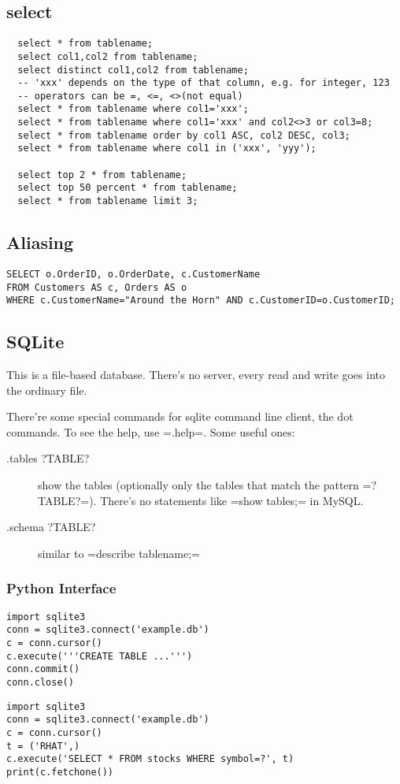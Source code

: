 \subsection{select}
\begin{lstlisting}
  select * from tablename;
  select col1,col2 from tablename;
  select distinct col1,col2 from tablename;
  -- 'xxx' depends on the type of that column, e.g. for integer, 123
  -- operators can be =, <=, <>(not equal)
  select * from tablename where col1='xxx';
  select * from tablename where col1='xxx' and col2<>3 or col3=8;
  select * from tablename order by col1 ASC, col2 DESC, col3;
  select * from tablename where col1 in ('xxx', 'yyy');

  select top 2 * from tablename;
  select top 50 percent * from tablename;
  select * from tablename limit 3;
\end{lstlisting}

\subsection{Aliasing}
\begin{lstlisting}
SELECT o.OrderID, o.OrderDate, c.CustomerName
FROM Customers AS c, Orders AS o
WHERE c.CustomerName="Around the Horn" AND c.CustomerID=o.CustomerID;
\end{lstlisting}

\subsection{SQLite}
This is a file-based database.  There's no server, every read and
write goes into the ordinary file.

There're some special commands for sqlite command line client, the dot commands.
To see the help, use =.help=.
Some useful ones:
\begin{description}
\item [.tables ?TABLE?] show the tables (optionally only the tables that match the pattern =?TABLE?=).
  There's no statements like =show tables;= in MySQL.
\item [.schema ?TABLE?] similar to =describe tablename;=
\end{description}


\subsubsection{Python Interface}
\begin{lstlisting}
import sqlite3
conn = sqlite3.connect('example.db')
c = conn.cursor()
c.execute('''CREATE TABLE ...''')
conn.commit()
conn.close()
\end{lstlisting}

\begin{lstlisting}
import sqlite3
conn = sqlite3.connect('example.db')
c = conn.cursor()
t = ('RHAT',)
c.execute('SELECT * FROM stocks WHERE symbol=?', t)
print(c.fetchone())
\end{lstlisting}



